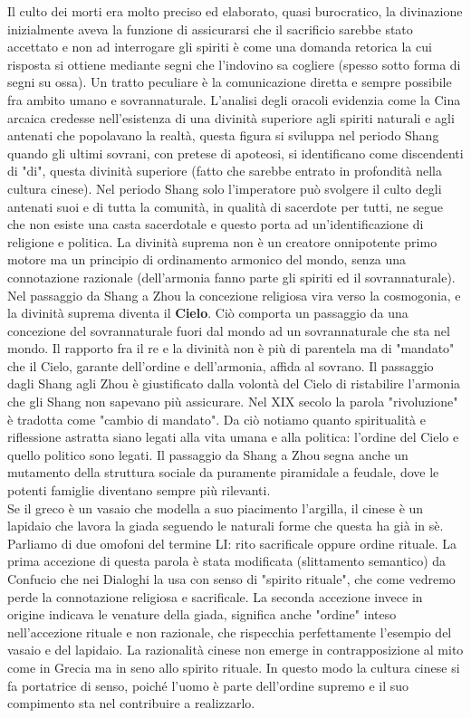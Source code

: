 \documentclass[10pt,a4paper]{report}
\begin{document}
Il culto dei morti era molto preciso ed elaborato, quasi burocratico, la divinazione inizialmente aveva la funzione di assicurarsi che il sacrificio sarebbe stato accettato e non ad interrogare gli spiriti è come una domanda retorica la cui risposta si ottiene mediante segni che l'indovino sa cogliere (spesso sotto forma di segni su ossa). Un tratto peculiare è la comunicazione diretta e sempre possibile fra ambito umano e sovrannaturale. L'analisi degli oracoli evidenzia come la Cina arcaica credesse nell'esistenza di una divinità superiore agli spiriti naturali e agli antenati che popolavano la realtà, questa figura si sviluppa nel periodo Shang quando gli ultimi sovrani, con pretese di apoteosi, si identificano come discendenti di "di", questa divinità superiore (fatto che sarebbe entrato in profondità nella cultura cinese). Nel periodo Shang solo l'imperatore può svolgere il culto degli antenati suoi e di tutta la comunità, in qualità di sacerdote per tutti, ne segue che non esiste una casta sacerdotale e questo porta ad un'identificazione di religione e politica. La divinità suprema non è un creatore onnipotente primo motore ma un principio di ordinamento armonico del mondo, senza una connotazione razionale (dell'armonia fanno parte gli spiriti ed il sovrannaturale). Nel passaggio da Shang a Zhou la concezione religiosa vira verso la cosmogonia, e la divinità suprema diventa il \textbf{Cielo}. Ciò comporta un passaggio da una concezione del sovrannaturale fuori dal mondo ad un sovrannaturale che sta nel mondo. Il rapporto fra il re e la divinità non è più di parentela ma di "mandato" che il Cielo, garante dell'ordine e dell'armonia, affida al sovrano. Il passaggio dagli Shang agli Zhou è giustificato dalla volontà del Cielo di ristabilire l'armonia che gli Shang non sapevano più assicurare. Nel XIX secolo la parola "rivoluzione" è tradotta come "cambio di mandato". Da ciò notiamo quanto spiritualità e riflessione astratta siano legati alla vita umana e alla politica: l'ordine del Cielo e quello politico sono legati. Il passaggio da Shang a Zhou segna anche un mutamento della struttura sociale da puramente piramidale a feudale, dove le potenti famiglie diventano sempre più rilevanti.\\
Se il greco è un vasaio che modella a suo piacimento l'argilla, il cinese è un lapidaio che lavora la giada seguendo le naturali forme che questa ha già in sè.
Parliamo di due omofoni del termine LI: rito sacrificale oppure ordine rituale. La prima accezione di questa parola è stata modificata (slittamento semantico) da Confucio che nei Dialoghi la usa con senso di "spirito rituale", che come vedremo perde la connotazione religiosa e sacrificale. La seconda accezione invece in origine indicava le venature della giada, significa anche "ordine" inteso nell'accezione rituale e non razionale, che rispecchia perfettamente l'esempio del vasaio e del lapidaio. La razionalità cinese non emerge in contrapposizione al mito come in Grecia ma in seno allo spirito rituale. In questo modo la cultura cinese si fa portatrice di senso, poiché l'uomo è parte dell'ordine supremo e il suo compimento sta nel contribuire a realizzarlo.\\
\end{document}
